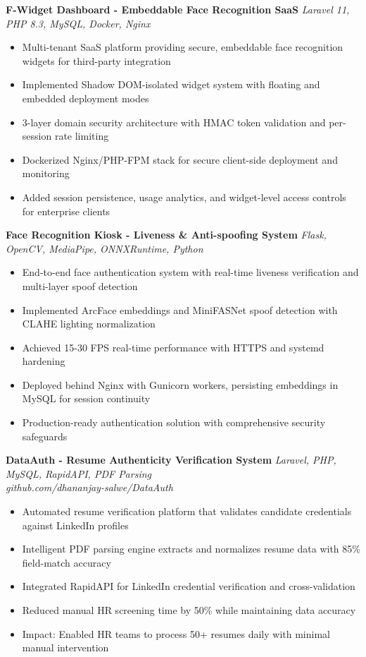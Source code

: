 \documentclass[10pt,letterpaper]{article}
\newcommand{\ressection}[2]{
    \textbf{#1} \hfill \textit{#2} \\
}
\newcommand{\resitem}[1]{
    \item #1 \vspace{-0.2em}
}
\newcommand{\ressubsection}[4]{
    \ressection{#1}{#2}
    \textit{#3} \newline
    #4
}
\begin{document}
\vspace{0.3em}

\ressubsection{F-Widget Dashboard - Embeddable Face Recognition SaaS}{Laravel 11, PHP 8.3, MySQL, Docker, Nginx}{}{
\begin{itemize}[itemsep=0.2em]
    \resitem{Multi-tenant SaaS platform providing secure, embeddable face recognition widgets for third-party integration}
    \resitem{Implemented Shadow DOM-isolated widget system with floating and embedded deployment modes}
    \resitem{3-layer domain security architecture with HMAC token validation and per-session rate limiting}
    \resitem{Dockerized Nginx/PHP-FPM stack for secure client-side deployment and monitoring}
    \resitem{Added session persistence, usage analytics, and widget-level access controls for enterprise clients}
\end{itemize}
}

\vspace{0.3em}

\ressubsection{Face Recognition Kiosk - Liveness \& Anti-spoofing System}{Flask, OpenCV, MediaPipe, ONNXRuntime, Python}{}{
\begin{itemize}[itemsep=0.2em]
    \resitem{End-to-end face authentication system with real-time liveness verification and multi-layer spoof detection}
    \resitem{Implemented ArcFace embeddings and MiniFASNet spoof detection with CLAHE lighting normalization}
    \resitem{Achieved 15-30 FPS real-time performance with HTTPS and systemd hardening}
    \resitem{Deployed behind Nginx with Gunicorn workers, persisting embeddings in MySQL for session continuity}
    \resitem{Production-ready authentication solution with comprehensive security safeguards}
\end{itemize}
}

\vspace{0.3em}

\ressubsection{DataAuth - Resume Authenticity Verification System}{Laravel, PHP, MySQL, RapidAPI, PDF Parsing}{
github.com/dhananjay-salwe/DataAuth
}{
\begin{itemize}[itemsep=0.2em]
    \resitem{Automated resume verification platform that validates candidate credentials against LinkedIn profiles}
    \resitem{Intelligent PDF parsing engine extracts and normalizes resume data with 85\% field-match accuracy}
    \resitem{Integrated RapidAPI for LinkedIn credential verification and cross-validation}
    \resitem{Reduced manual HR screening time by 50\% while maintaining data accuracy}
    \resitem{Impact: Enabled HR teams to process 50+ resumes daily with minimal manual intervention}
\end{itemize}
}
\end{document}
